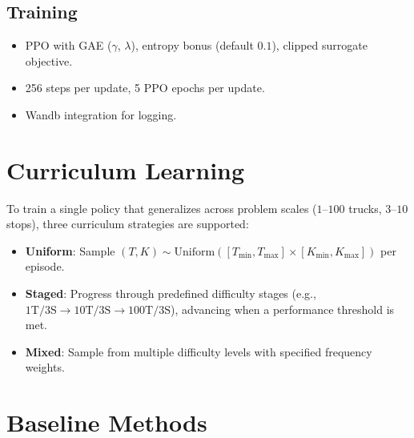 \documentclass[11pt]{article}
\begin{document}
\subsection{Training}

\begin{itemize}[nosep]
    \item PPO with GAE ($\gamma$, $\lambda$), entropy bonus (default $0.1$), clipped surrogate objective.
    \item 256 steps per update, 5 PPO epochs per update.
    \item Wandb integration for logging.
\end{itemize}

\section{Curriculum Learning}\label{sec:curriculum}

To train a single policy that generalizes across problem scales ($1$--$100$ trucks, $3$--$10$ stops), three curriculum strategies are supported:
\begin{itemize}[nosep]
    \item \textbf{Uniform}: Sample $(T, K) \sim \text{Uniform}([T_{\min}, T_{\max}] \times [K_{\min}, K_{\max}])$ per episode.
    \item \textbf{Staged}: Progress through predefined difficulty stages (e.g., $1\text{T}/3\text{S} \to 10\text{T}/3\text{S} \to 100\text{T}/3\text{S}$), advancing when a performance threshold is met.
    \item \textbf{Mixed}: Sample from multiple difficulty levels with specified frequency weights.
\end{itemize}

\section{Baseline Methods}
\end{document}
